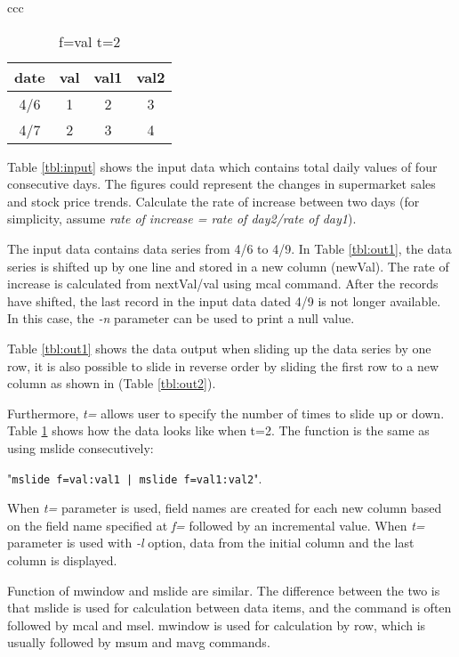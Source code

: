 \documentclass[a4paper]{jarticle}
\begin{document}
\begin{table}[htbp]
\begin{center}
\begin{tabular}{ccc}
\begin{minipage}{0.30\hsize}
\begin{center}
\caption{f=val t=2\label{tbl:out3}}
{\small
\begin{tabular}{cccc}
\hline
date&val&val1&val2 \\
\hline
4/6&1&2&3 \\
4/7&2&3&4 \\
\hline
\end{tabular}
}
\end{center}
\end{minipage}

\end{tabular}
\end{center}
\end{table}

Table \ref{tbl:input} shows the input data which contains total daily values of four consecutive days. The figures could represent the changes in supermarket sales  and stock price trends. 
Calculate the rate of increase between two days (for simplicity, assume \emph{ rate of increase =  rate of day2/rate of day1}).

The input data contains data series from 4/6 to 4/9. In Table \ref{tbl:out1}, the data series is shifted up by one line and stored in a new column (newVal). The rate of increase is calculated from nextVal/val using mcal command. After the records have shifted, the last record in the input data dated 4/9 is not longer available. In this case, the \emph{-n} parameter can be used to print a null value.

Table \ref{tbl:out1} shows the data output when sliding up the data series by one row, it is also possible to slide in reverse order by sliding the first row to a new column as shown in (Table \ref{tbl:out2}).

Furthermore, \emph{t=} allows user to specify the number of times to slide up or down. Table \ref{tbl:out3} shows how the data looks like when t=2. The function is the same as using mslide consecutively:
 
"\verb&mslide f=val:val1 | mslide f=val1:val2&". 

When \emph{t=} parameter is used, field names are created for each new column based on the field name specified at \emph{f=} followed by an incremental value. When \emph{t=} parameter is used with \emph{-l} option, data from the initial column and the last column is displayed. 

Function of mwindow and mslide are similar. The difference between the two is that mslide is used for calculation between data items, and the command is often followed by mcal and msel.  mwindow is used for calculation by row, which is usually followed by msum and mavg commands. 
\end{document}

